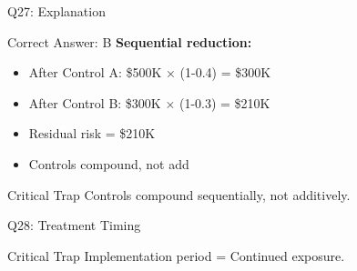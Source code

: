 \documentclass{beamer}
\begin{document}
						\begin{frame}{Q27: Explanation}
							\begin{block}{Correct Answer: B}
								\textbf{Sequential reduction:}
								\begin{itemize}
									\item After Control A: \$500K × (1-0.4) = \$300K
									\item After Control B: \$300K × (1-0.3) = \$210K
									\item Residual risk = \$210K
									\item Controls compound, not add
								\end{itemize}
							\end{block}
							\begin{alertblock}{Critical Trap}
								Controls compound sequentially, not additively.
							\end{alertblock}
						\end{frame}
						
						\begin{frame}{Q28: Treatment Timing}
								\begin{alertblock}{Critical Trap}
									Implementation period = Continued exposure.
								\end{alertblock}
							\end{frame}
							
\end{document}
